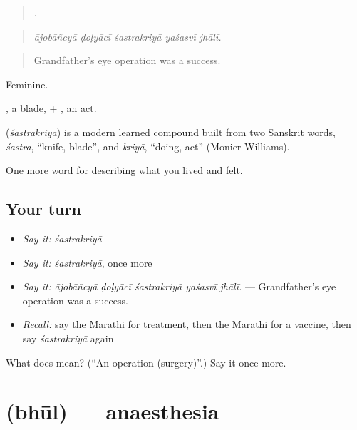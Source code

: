 \begin{quote}
    .
\end{quote}

\begin{quote}
\emph{ājobāñcyā ḍoḷyācī śastrakriyā yaśasvī jhālī.}
\end{quote}

\begin{quote}
Grandfather's eye operation was a success.
\end{quote}

Feminine.

, a blade, + , an act.

\begin{cousinweb}
\textbf{} (\emph{śastrakriyā}) is a modern learned compound built from two Sanskrit words, \emph{śastra}, \textquotedblleft{}knife, blade\textquotedblright{}, and \emph{kriyā}, \textquotedblleft{}doing, act\textquotedblright{} (Monier-Williams).
\end{cousinweb}

\begin{grammarlens}[title={What you've built}]
One more word for describing what you lived and felt.
\end{grammarlens}

\subsection*{Your turn}
\begin{itemize}
\raggedright
  \item \emph{Say it:} \emph{śastrakriyā}
  \item \emph{Say it:} \emph{śastrakriyā}, once more
  \item \emph{Say it:} \emph{ājobāñcyā ḍoḷyācī śastrakriyā yaśasvī jhālī.} — Grandfather's eye operation was a success.
  \item \emph{Recall:} say the Marathi for treatment, then the Marathi for a vaccine, then say \emph{śastrakriyā} again
\end{itemize}

\begin{tcolorbox}[breakable,colback=teal!4,colframe=teal!35!black,title={Before you move on}]
What does  mean? (\textquotedblleft{}An operation (surgery)\textquotedblright{}.) Say it once more.
\end{tcolorbox}
\section[\texorpdfstring{\mr{भूल} (bhūl)}{भूल (bhūl)}]{ (bhūl) — anaesthesia}

